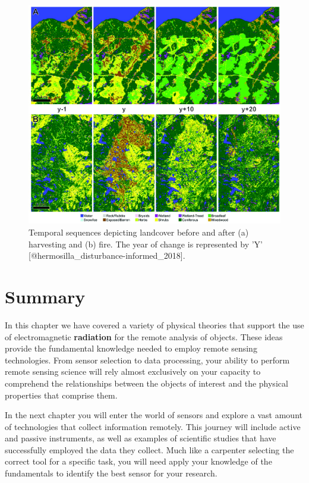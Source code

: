 \documentclass[
]{book}
\begin{document}
\begin{figure}
\includegraphics[width=0.9\linewidth]{images/11-hermo-disturbance} \caption{Temporal sequences depicting landcover before and after (a) harvesting and (b) fire. The year of change is represented by 'Y' [@hermosilla_disturbance-informed_2018].}\label{fig:11-hermo-disturb}
\end{figure}

\hypertarget{summary-4}{%
\section{Summary}\label{summary-4}}

In this chapter we have covered a variety of physical theories that
support the use of electromagnetic \textbf{radiation} for the remote analysis
of objects. These ideas provide the fundamental knowledge needed to
employ remote sensing technologies. From sensor selection to data
processing, your ability to perform remote sensing science will rely
almost exclusively on your capacity to comprehend the relationships
between the objects of interest and the physical properties that
comprise them.

In the next chapter you will enter the world of sensors and explore a
vast amount of technologies that collect information remotely. This
journey will include active and passive instruments, as well as examples
of scientific studies that have successfully employed the data they
collect. Much like a carpenter selecting the correct tool for a specific
task, you will need apply your knowledge of the fundamentals to identify
the best sensor for your research.
\end{document}
